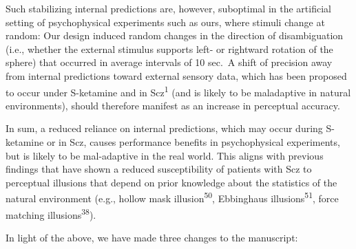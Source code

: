 \documentclass[
]{article}
\begin{document}
Such stabilizing internal predictions are, however, suboptimal in the
artificial setting of psychophysical experiments such as ours, where
stimuli change at random: Our design induced random changes in the
direction of disambiguation (i.e., whether the external stimulus
supports left- or rightward rotation of the sphere) that occurred in
average intervals of 10 sec.~A shift of precision away from internal
predictions toward external sensory data, which has been proposed to
occur under S-ketamine and in Scz\textsuperscript{1} (and is likely to
be maladaptive in natural environments), should therefore manifest as an
increase in perceptual accuracy.

In sum, a reduced reliance on internal predictions, which may occur
during S-ketamine or in Scz, causes performance benefits in
psychophysical experiments, but is likely to be mal-adaptive in the real
world. This aligns with previous findings that have shown a reduced
susceptibility of patients with Scz to perceptual illusions that depend
on prior knowledge about the statistics of the natural environment
(e.g., hollow mask illusion\textsuperscript{50}, Ebbinghaus
illusions\textsuperscript{51}, force matching
illusions\textsuperscript{38}).

In light of the above, we have made three changes to the manuscript:
\end{document}
